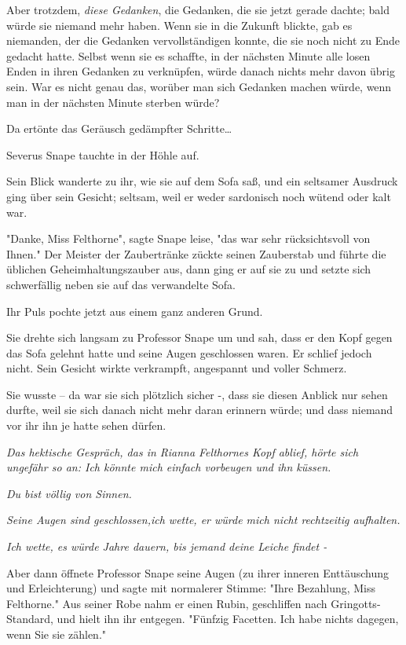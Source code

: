 {Aber trotzdem, \emph{diese Gedanken}, die Gedanken, die sie jetzt gerade dachte; bald würde sie niemand mehr haben. Wenn sie in die Zukunft blickte, gab es niemanden, der die Gedanken vervollständigen konnte, die sie noch nicht zu Ende gedacht hatte. Selbst wenn sie es schaffte, in der nächsten Minute alle losen Enden in ihren Gedanken zu verknüpfen, würde danach nichts mehr davon übrig sein. War es nicht genau das, worüber man sich Gedanken machen würde, wenn man in der nächsten Minute sterben würde?

Da ertönte das Geräusch gedämpfter Schritte…

Severus Snape tauchte in der Höhle auf.

Sein Blick wanderte zu ihr, wie sie auf dem Sofa saß, und ein seltsamer Ausdruck ging über sein Gesicht; seltsam, weil er weder sardonisch noch wütend oder kalt war.

"Danke, Miss Felthorne", sagte Snape leise, "das war sehr rücksichtsvoll von Ihnen." Der Meister der Zaubertränke zückte seinen Zauberstab und führte die üblichen Geheimhaltungszauber aus, dann ging er auf sie zu und setzte sich schwerfällig neben sie auf das verwandelte Sofa.

Ihr Puls pochte jetzt aus einem ganz anderen Grund.

Sie drehte sich langsam zu Professor Snape um und sah, dass er den Kopf gegen das Sofa gelehnt hatte und seine Augen geschlossen waren. Er schlief jedoch nicht. Sein Gesicht wirkte verkrampft, angespannt und voller Schmerz.

Sie wusste -- da war sie sich plötzlich sicher -, dass sie diesen Anblick nur sehen durfte, weil sie sich danach nicht mehr daran erinnern würde; und dass niemand vor ihr ihn je hatte sehen dürfen.

\emph{Das hektische Gespräch, das in Rianna Felthornes Kopf ablief, hörte sich ungefähr so an: \emph{Ich könnte mich einfach vorbeugen und ihn küssen.}}

\emph{\emph{Du bist völlig von Sinnen.}}

\emph{\emph{Seine Augen sind geschlossen,ich wette, er würde mich nicht rechtzeitig aufhalten.}}

\emph{Ich wette, es würde Jahre dauern, bis jemand deine Leiche findet -}

Aber dann öffnete Professor Snape seine Augen (zu ihrer inneren Enttäuschung und Erleichterung) und sagte mit normalerer Stimme: "Ihre Bezahlung, Miss Felthorne." Aus seiner Robe nahm er einen Rubin, geschliffen nach Gringotts-Standard, und hielt ihn ihr entgegen. "Fünfzig Facetten. Ich habe nichts dagegen, wenn Sie sie zählen."

}
